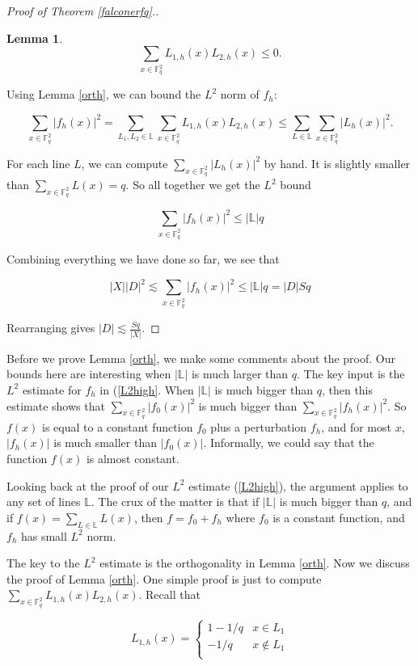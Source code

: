 \documentclass[12pt]{amsart}
\newtheorem{lemma}[theorem]{Lemma}
\newcommand{\FF}{\mathbb{F}}
\newcommand{\LL}{\mathbb{L}}
\begin{document}
\begin{proof} [Proof of Theorem \ref{falconerfq}.]
\begin{lemma}
$$ \sum_{x \in \FF_q^2} L_{1,h}(x) L_{2,h}(x) \le 0.$$
\end{lemma}

Using Lemma \ref{orth}, we can bound the $L^2$ norm of $f_h$:

$$\sum_{x \in \FF_q^2} |f_h(x)|^2 = \sum_{L_1, L_2 \in \LL} \sum_{x \in \FF_q^2} L_{1,h}(x) L_{2,h}(x) \le \sum_{L \in \LL} \sum_{x \in \FF_q^2} |L_h(x)|^2 .$$

For each line $L$, we can compute $\sum_{x \in \FF_q^2} |L_h(x)|^2$ by hand.  It is slightly smaller than $\sum_{x \in \FF_q^2} L(x)= q$.  So all together we get the $L^2$ bound

\begin{equation} \label{L2high}
   \sum_{x \in \FF_q^2} |f_h(x)|^2 \le | \LL | q 
\end{equation}

Combining everything we have done so far, we see that

$$ |X| |D|^2 \lesssim  \sum_{x \in \FF_q^2} |f_h(x)|^2 \le | \LL | q = |D| S q$$

Rearranging gives $|D| \lesssim \frac{S q}{|X|}$.

\end{proof}
    
Before we prove Lemma \ref{orth}, we make some comments about the proof.  Our bounds here are interesting when $| \LL |$ is much larger than $q$.  The key input is the $L^2$ estimate for $f_h$ in (\ref{L2high}.  When $| \LL |$ is much bigger than $q$, then this estimate shows that $\sum_{x \in \FF_q^2} |f_0(x)|^2$ is much bigger than  $\sum_{x \in \FF_q^2} |f_h(x)|^2$.  So $f(x)$ is equal to a constant function $f_0$ plus a perturbation $f_h$, and for most $x$, $|f_h(x)|$ is much smaller than $|f_0(x)|$.  Informally, we could say that the function $f(x)$ is almost constant.

Looking back at the proof of our $L^2$ estimate (\ref{L2high}), the argument applies to any set of lines $\LL$.  The crux of the matter is that if $| \LL |$ is much bigger than $q$, and if $f(x) = \sum_{L \in \LL} L(x)$, then $f = f_0 + f_h$ where $f_0$ is a constant function, and $f_h$ has small $L^2$ norm.

The key to the $L^2$ estimate is the orthogonality in Lemma \ref{orth}.
Now we discuss the proof of Lemma \ref{orth}.  One simple proof is just to compute $\sum_{x \in \FF_q^2} L_{1,h}(x) L_{2,h}(x)$.  Recall that

$$ L_{1,h}(x) = \begin{cases} 1 - 1/q & x \in L_1 \\ - 1/q & x \notin L_1 \\
    \end{cases}
$$
\end{document}
